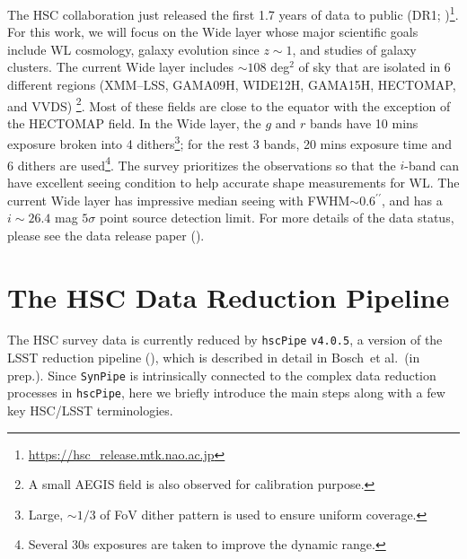 \documentclass[useamsfonts]{pasj01}
\def\asec{$^{\prime\prime}$}
\def\etal{{\ et al.~}}
\def\hscpipe{\texttt{hscPipe}}
\def\synpipe{\texttt{SynPipe}}
\begin{document}
    The HSC collaboration just released the first 1.7 years of data to public (DR1; 
    \citealt{HSCDR1})\footnote{\url{https://hsc_release.mtk.nao.ac.jp}}.
    For this work, we will focus on the Wide layer whose major scientific goals include
    WL cosmology, galaxy evolution since $z{\sim}1$, and studies of galaxy clusters. 
    The current Wide layer includes ${\sim}108$ deg$^2$ of sky that are isolated in 
    6 different regions (XMM--LSS, GAMA09H, WIDE12H, GAMA15H, HECTOMAP, and VVDS)
    \footnote{A small AEGIS field is also observed for calibration purpose.}.
    Most of these fields are close to the equator with the exception of the HECTOMAP 
    field. 
    In the Wide layer, the $g$ and $r$ bands have 10 mins exposure broken into 4 
    dithers\footnote{Large, ${\sim}1/3$ of FoV dither pattern is used to ensure 
    uniform coverage.}; for the rest 3 bands, 20 mins exposure time and 6 dithers are 
    used\footnote{Several 30s exposures are taken to improve the dynamic range.}. 
    The survey prioritizes the observations so that the $i$-band can have excellent 
    seeing condition to help accurate shape measurements for WL. 
    The current Wide layer has impressive median seeing with FWHM${\sim}0.6$\asec{}, 
    and has a $i{\sim} 26.4$ mag $5\sigma$ point source detection limit.
    For more details of the data status, please see the data release paper 
    (\citealt{HSCDR1}).  

\section{The HSC Data Reduction Pipeline}
    \label{ssec:hscpipe}
    
    The HSC survey data is currently reduced by \hscpipe{} \texttt{v4.0.5}, a 
    version of the LSST reduction pipeline (\citealt{Ivezic2008, Axelrod2010, 
    Juric2015}), which is described in detail in Bosch\etal (in prep.). 
    Since \synpipe{} is intrinsically connected to the complex data reduction 
    processes in \hscpipe{}, here we briefly introduce the main steps along with 
    a few key HSC/LSST terminologies. 
    
\end{document}
